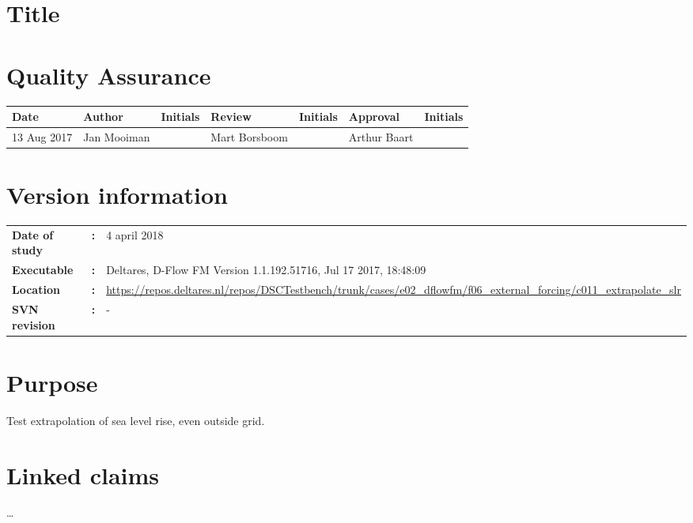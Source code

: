 \section{Title}
\newrefsegment

\section*{Quality Assurance}
{{\footnotesize
\begin{tabular}{p{22mm-2pt}@{}p{27mm-2pt}@{}p{18mm}@{}p{27mm-2pt}@{}p{18mm}@{}p{27mm-2pt}@{}p{\textwidth-139mm-1pt}} \hline
    \rowcolor{dgrey4}
\textbf{Date} & \textbf{Author} & \textbf{Initials} & \textbf{Review} & \textbf{Initials} & \textbf{Approval} & \textbf{Initials}  \\ \hline
13 Aug 2017 & Jan Mooiman & & Mart Borsboom & & Arthur Baart &   \\ \hline
  \end{tabular}
}}

\section*{Version information}
\begin{tabular}{@{}p{23mm}@{}p{0mm}p{\textwidth-23mm-30pt}}
\textbf{Date of study}& \textbf{:} & 4 april 2018 \\
\textbf{Executable}   & \textbf{:} & Deltares, D-Flow FM Version 1.1.192.51716, Jul 17 2017, 18:48:09 \\
\textbf{Location}     & \textbf{:} & \url{https://repos.deltares.nl/repos/DSCTestbench/trunk/cases/e02_dflowfm/f06_external_forcing/c011_extrapolate_slr} \\
\textbf{SVN revision} & \textbf{:} & -
\end{tabular}

\section*{Purpose}

Test extrapolation of sea level rise, even outside grid.

\section*{Linked claims}
\ldots

